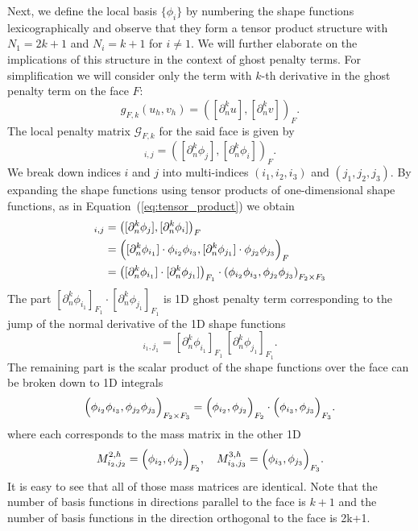 \documentclass[11pt,a4paper]{article}
\begin{document}
Next, we define the local basis $ \{ \phi_i \}$ by numbering the shape functions lexicographically and observe that
they form a tensor product structure with $ N_1=2k+1$ and $ N_i=k+1$ for $i\neq 1$. We will further elaborate on the
implications of this structure in the context of ghost penalty terms. For simplification we will consider only the term
with \( k \)-th derivative in the ghost penalty term on the face \( F \):
\begin{equation}
    g_{F,k}(u_h, v_h) =
    \left( [\partial_n^k u], [\partial_n^k v]  \right)_F .
\end{equation}
The local penalty matrix $\mathcal{G}_{F,k}$ for the said face is given by
\begin{equation}
    [\mathcal{G}_{F,k} ]_{i,j} =
    \left( [\partial_n^k \phi_j], [\partial_n^k \phi_i] \right)_F.
\end{equation}
We break down indices \( i \) and \( j \) into multi-indices \( (i_1, i_2, i_3) \) and \( (j_1, j_2, j_3)\). By
expanding the shape functions using tensor products of one-dimensional shape functions, as in
Equation~(\ref{eq:tensor_product}) we obtain
\begin{align}
    [\mathcal{G}_{F,k} ]_{i,j} &
    = \left( [\partial_n^k \phi_j], [\partial_n^k \phi_i] \right)_F                             \\
                               & = \Bigl( [\partial_n^k \phi_{i_1}] \cdot \phi_{i_2}\phi_{i_3},
    [\partial_n^k \phi_{j_1}] \cdot \phi_{j_2}\phi_{j_3} \Bigr)_F                               \\
                               & =  \left([\partial_n^k \phi_{i_1}] \cdot [\partial_n^k
        \phi_{j_1}]\right)_{F_1} \cdot
    \left( \phi_{i_2}\phi_{i_3} , \phi_{j_2}\phi_{j_3} \right)_{F_2\times F_3}
\end{align}
The part $  [\partial_n^k \phi_{i_1}]_{F_1} \cdot [\partial_n^k     \phi_{j_1}]_{F_1} $
is   1D ghost penalty term corresponding to the  jump of the normal derivative of the 1D shape functions
\begin{equation}
    [G^h_k]_{i_1,j_1} = \left[\partial_n^k \phi_{i_1}\right]_{F_1} \, \left[\partial_n^k
        \phi_{j_1}\right]_{F_1}.
\end{equation}
The remaining part is the scalar product of the shape functions over the face can be broken down to 1D integrals
\begin{equation}
    \Bigl( \phi_{i_2}\phi_{i_3} , \phi_{j_2}\phi_{j_3} \Bigr)_{F_2\times F_3}
    = \Bigl( \phi_{i_2} , \phi_{j_2} \Bigr)_{F_2} \cdot \Bigl( \phi_{i_3} , \phi_{j_3} \Bigr)_{F_3}.
\end{equation}
where each corresponds to the mass matrix in the other 1D
\begin{equation}
    M^{2,h }_{i_2,j_2} = \Bigl( \phi_{i_2} , \phi_{j_2} \Bigr)_{F_2}, \quad
    M^{3,h}_{i_3,j_3} = \Bigl( \phi_{i_3} , \phi_{j_3} \Bigr)_{F_3}.
\end{equation}
It is easy to see that all of those mass matrices are identical. Note that the number of basis functions in directions
parallel to the face is $k+1$ and the number of basis functions in the direction orthogonal to the face is
2k+1.
\end{document}

